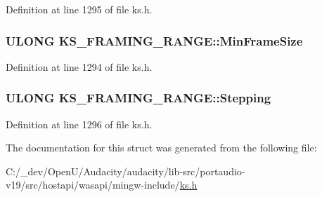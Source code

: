 Definition at line 1295 of file ks.\+h.

\subsubsection[{\texorpdfstring{Min\+Frame\+Size}{MinFrameSize}}]{\setlength{\rightskip}{0pt plus 5cm}U\+L\+O\+NG K\+S\+\_\+\+F\+R\+A\+M\+I\+N\+G\+\_\+\+R\+A\+N\+G\+E\+::\+Min\+Frame\+Size}\hypertarget{struct_k_s___f_r_a_m_i_n_g___r_a_n_g_e_ac7091ebd791a42498b4694e0dba4456f}{}\label{struct_k_s___f_r_a_m_i_n_g___r_a_n_g_e_ac7091ebd791a42498b4694e0dba4456f}


Definition at line 1294 of file ks.\+h.

\subsubsection[{\texorpdfstring{Stepping}{Stepping}}]{\setlength{\rightskip}{0pt plus 5cm}U\+L\+O\+NG K\+S\+\_\+\+F\+R\+A\+M\+I\+N\+G\+\_\+\+R\+A\+N\+G\+E\+::\+Stepping}\hypertarget{struct_k_s___f_r_a_m_i_n_g___r_a_n_g_e_a71fde719551b13f41fe6a6449866345d}{}\label{struct_k_s___f_r_a_m_i_n_g___r_a_n_g_e_a71fde719551b13f41fe6a6449866345d}


Definition at line 1296 of file ks.\+h.



The documentation for this struct was generated from the following file\+:\begin{DoxyCompactItemize}
\item 
C\+:/\+\_\+dev/\+Open\+U/\+Audacity/audacity/lib-\/src/portaudio-\/v19/src/hostapi/wasapi/mingw-\/include/\hyperlink{ks_8h}{ks.\+h}\end{DoxyCompactItemize}
